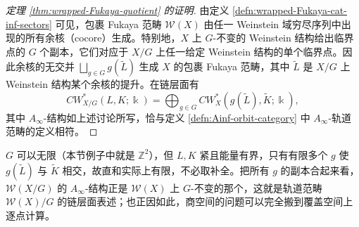 \begin{proof}[定理 \ref{thm:wrapped-Fukaya-quotient} 的证明]
    由定义 \ref{defn:wrapped-Fukaya-cat-inf-sectors} 可见，包裹 Fukaya 范畴 $\mathcal{W} (X)$ 由任一 Weinstein 域穷尽序列中出现的所有余核（cocore）生成。特别地，$X$ 上 $G$-不变的 Weinstein 结构给出临界点的 $G$ 个副本，它们对应于 $X/G$ 上任一给定 Weinstein 结构的单个临界点。因此余核的无交并 $\displaystyle\bigsqcup_{g\in G} g(\tilde{L})$ 生成 $X$ 的包裹 Fukaya 范畴，其中 $\tilde{L}$ 是 $X/G$ 上 Weinstein 结构某个余核的提升。在链层面有
\[
        CW^{\ast}_{X/G}\left(L,K;\Bbbk\right)=\bigoplus_{g\in G} CW^{\ast}_X (g(\tilde{L}),\tilde{K};\Bbbk),
    \]
其中 $A_{\infty}$-结构如上述讨论所写，恰与定义 \ref{defn:Ainf-orbit-category} 中 $A_{\infty}$-轨道范畴的定义相符。
\end{proof}

\begin{yizhu}[链层面的直和其实有限]
    $G$ 可以无限（本节例子中就是 $\mathbb{Z}^2$），但 $L,K$ 紧且能量有界，只有有限多个 $g$ 使 $g(\tilde{L})$ 与 $\tilde{K}$ 相交，故直和实际上有限，不必取补全。把所有 $g$ 的副本合起来看，$\mathcal{W}(X/G)$ 的 $A_{\infty}$-结构正是 $\mathcal{W}(X)$ 上 $G$-不变的那个，这就是轨道范畴 $\mathcal{W}(X)/G$ 的链层面表述；也正因如此，商空间的问题可以完全搬到覆盖空间上逐点计算。
\end{yizhu}

